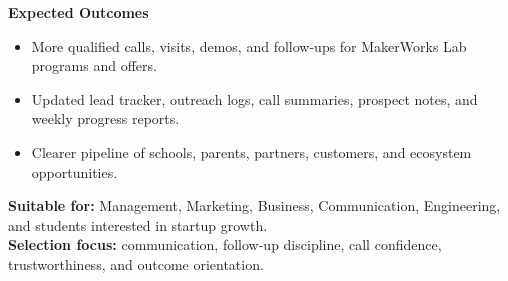 \documentclass[10pt,a4paper]{article}
\newcommand{\RoleSection}[1]{\vspace{5pt}\par\noindent\textbf{#1}\par\vspace{2pt}}
\begin{document}
{\RoleSection{Expected Outcomes}
\begin{itemize}
  \item More qualified calls, visits, demos, and follow-ups for MakerWorks Lab programs and offers.
  \item Updated lead tracker, outreach logs, call summaries, prospect notes, and weekly progress reports.
  \item Clearer pipeline of schools, parents, partners, customers, and ecosystem opportunities.
\end{itemize}

\textbf{Suitable for:} Management, Marketing, Business, Communication, Engineering, and students interested in startup growth.\\
\textbf{Selection focus:} communication, follow-up discipline, call confidence, trustworthiness, and outcome orientation.
}
\end{document}
